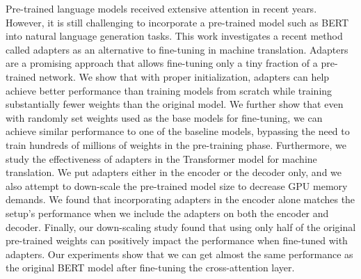 Pre-trained language models received extensive attention in recent years. However, it is still challenging to incorporate a pre-trained model such as BERT into natural language generation tasks. This work investigates a recent method called adapters as an alternative to fine-tuning in machine translation. Adapters are a promising approach that allows fine-tuning only a tiny fraction of a pre-trained network.
We show that with proper initialization, adapters can help achieve better performance than training models from scratch while training substantially fewer weights than the original model.
We further show that even with randomly set weights used as the base models for fine-tuning, we can achieve similar performance to one of the baseline models, bypassing the need to train hundreds of millions of weights in the pre-training phase.
Furthermore, we study the effectiveness of adapters in the Transformer model for machine translation. We put adapters either in the encoder or the decoder only, and we also attempt to down-scale the pre-trained model size to decrease GPU memory demands.
We found that incorporating adapters in the encoder alone matches the setup's performance when we include the adapters on both the encoder and decoder.
Finally, our down-scaling study found that using only half of the original pre-trained weights can positively impact the performance when fine-tuned with adapters. Our experiments show that we can get almost the same performance as the original BERT model after fine-tuning the cross-attention layer.